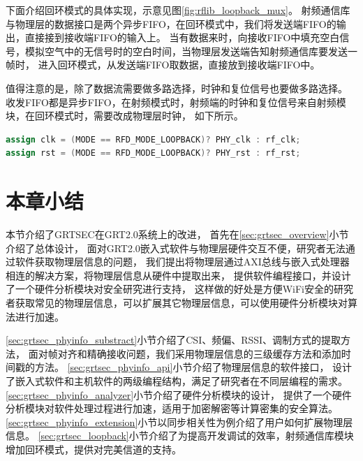	下面介绍回环模式的具体实现，示意见图\ref{fig:rflib_loopback_mux}。
	射频通信库与物理层的数据接口是两个异步FIFO，在回环模式中，我们将发送端FIFO的输出，直接接到接收端FIFO的输入上。
	当有数据来时，向接收FIFO中填充空白信号，模拟空气中的无信号时的空白时间，当物理层发送端告知射频通信库要发送一帧时，
	进入回环模式，从发送端FIFO取数据，直接放到接收端FIFO中。

	值得注意的是，除了数据流需要做多路选择，时钟和复位信号也要做多路选择。
	收发FIFO都是异步FIFO，在射频模式时，射频端的时钟和复位信号来自射频模块，在回环模式时，需要改成物理层时钟，
	如下所示。
	\begin{lstlisting}[language={Verilog}]
assign clk = (MODE == RFD_MODE_LOOPBACK)? PHY_clk : rf_clk;
assign rst = (MODE == RFD_MODE_LOOPBACK)? PHY_rst : rf_rst;
	\end{lstlisting}

	\section{本章小结}\label{sec:grt2.0_summary}
	本节介绍了GRTSEC在GRT2.0系统上的改进，
	首先在\ref{sec:grtsec_overview}小节介绍了总体设计，
	面对GRT2.0嵌入式软件与物理层硬件交互不便，研究者无法通过软件获取物理层信息的问题，
	我们提出将物理层通过AXI总线与嵌入式处理器相连的解决方案，将物理层信息从硬件中提取出来，
	提供软件编程接口，并设计了一个硬件分析模块对安全研究进行支持，
	这样做的好处是方便WiFi安全的研究者获取常见的物理层信息，可以扩展其它物理层信息，可以使用硬件分析模块对算法进行加速。

	\ref{sec:grtsec_phyinfo_substract}小节介绍了CSI、频偏、RSSI、调制方式的提取方法，
	面对帧对齐和精确接收问题，我们采用物理层信息的三级缓存方法和添加时间戳的方法。
	\ref{sec:grtsec_phyinfo_api}小节介绍了物理层信息的软件接口，
	设计了嵌入式软件和主机软件的两级编程结构，满足了研究者在不同层编程的需求。
	\ref{sec:grtsec_phyinfo_analyzer}小节介绍了硬件分析模块的设计，
	提供了一个硬件分析模块对软件处理过程进行加速，适用于加密解密等计算密集的安全算法。
	\ref{sec:grtsec_phyinfo_extension}小节以同步相关性为例介绍了用户如何扩展物理层信息。
	\ref{sec:grtsec_loopback}小节介绍了为提高开发调试的效率，射频通信库模块增加回环模式，提供对完美信道的支持。
